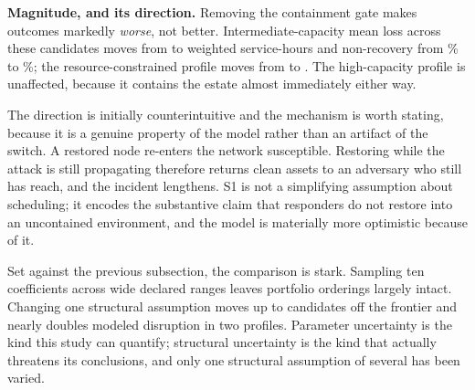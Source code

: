 \textbf{Magnitude, and its direction.} Removing the containment gate makes
outcomes markedly \emph{worse}, not better. Intermediate-capacity mean loss
across these candidates moves from \StructuralIntermediateGatedMeanLoss{} to
\StructuralIntermediateParallelMeanLoss{} weighted service-hours and
non-recovery from \StructuralIntermediateGatedNonRecovery\% to
\StructuralIntermediateParallelNonRecovery\%; the resource-constrained
profile moves from \StructuralResourceConstrainedGatedMeanLoss{} to
\StructuralResourceConstrainedParallelMeanLoss{}. The high-capacity profile
is unaffected, because it contains the estate almost immediately either way.

The direction is initially counterintuitive and the mechanism is worth
stating, because it is a genuine property of the model rather than an
artifact of the switch. A restored node re-enters the network susceptible.
Restoring while the attack is still propagating therefore returns clean
assets to an adversary who still has reach, and the incident lengthens. S1 is
not a simplifying assumption about scheduling; it encodes the substantive
claim that responders do not restore into an uncontained environment, and the
model is materially more optimistic because of it.

Set against the previous subsection, the comparison is stark. Sampling ten
coefficients across wide declared ranges leaves portfolio orderings largely
intact. Changing one structural assumption moves up to
\StructuralOnlyGated{} candidates off the frontier and nearly doubles modeled
disruption in two profiles. Parameter uncertainty is the kind this study can
quantify; structural uncertainty is the kind that actually threatens its
conclusions, and only one structural assumption of several has been varied.
